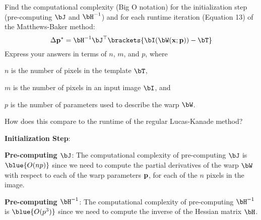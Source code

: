 \newpage
\begin{problem}
  Find the computational complexity (Big O notation) for the initialization
  step (pre-computing $\bJ$ and $\bH^{-1}$) and for each runtime iteration
  (Equation 13) of the Matthews-Baker method:
  \[
    \Delta \bp^\ast = \bH^{-1} \bJ^\top \brackets{\bI(\bW(\bx; \bp)) - \bT}
  \]
  Express your answers in terms of $n$, $m$, and $p$, where
  \begin{enumroman}
    \item $n$ is the number of pixels in the template $\bT$,
    \item $m$ is the number of pixels in an input image $\bI$, and
    \item $p$ is the number of parameters used to describe the warp $\bW$.
  \end{enumroman}
  How does this compare to the runtime of the regular Lucas-Kanade method?
  \begin{answer}
    \begin{enumarabic}
      \item \textbf{Initialization Step}:
        \begin{enumalph}
          \item \textbf{Pre-computing $\bJ$}:
            The computational complexity of pre-computing $\bJ$ is
            $\blue{O(np)}$ since we need to compute the partial derivatives
            of the warp $\bW$ with respect to each of the warp parameters $\mathbf{p}$,
            for each of the $n$ pixels in the image.
          \item \textbf{Pre-computing $\bH^{-1}$}:
            The computational complexity of pre-computing $\bH^{-1}$ is
            $\blue{O(p^3)}$ since we need to compute the inverse of the
            Hessian matrix $\bH$.
        \end{enumalph}
    \end{enumarabic}
  \end{answer}
\end{problem}
